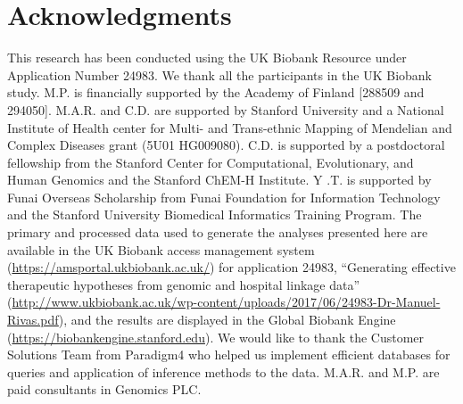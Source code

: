 \section*{Acknowledgments}
This research has been conducted using the UK Biobank Resource under Application Number 24983. We thank all the participants in the UK Biobank study. M.P. is financially supported by the Academy of Finland [288509 and 294050]. M.A.R. and C.D. are supported by Stanford University and a National Institute of Health center for Multi- and Trans-ethnic Mapping of Mendelian and Complex Diseases grant (5U01 HG009080). C.D. is supported by a postdoctoral fellowship from the Stanford Center for Computational, Evolutionary, and Human Genomics and the Stanford ChEM-H Institute. Y .T. is supported by Funai Overseas Scholarship from Funai Foundation for Information Technology and the Stanford University Biomedical Informatics Training Program. The primary and processed data used to generate the analyses presented here are available in the UK Biobank access management system (\url{https://amsportal.ukbiobank.ac.uk/}) for application 24983, ``Generating effective therapeutic hypotheses from genomic and hospital linkage data'' (\url{http://www.ukbiobank.ac.uk/wp-content/uploads/2017/06/24983-Dr-Manuel-Rivas.pdf}), and the results are displayed in the Global Biobank Engine (\url{https://biobankengine.stanford.edu}). We would like to thank the Customer Solutions Team from Paradigm4 who helped us implement efficient databases for queries and application of inference methods to the data. M.A.R. and M.P. are paid consultants in Genomics PLC. 

\nolinenumbers

% 

